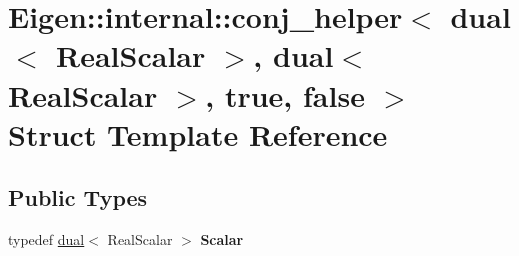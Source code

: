 \hypertarget{struct_eigen_1_1internal_1_1conj__helper_3_01dual_3_01_real_scalar_01_4_00_01dual_3_01_real_scal6e28e8a9ebcfb8ddcb71a8128b9186c8}{\section{Eigen\-:\-:internal\-:\-:conj\-\_\-helper$<$ dual$<$ Real\-Scalar $>$, dual$<$ Real\-Scalar $>$, true, false $>$ Struct Template Reference}
\label{struct_eigen_1_1internal_1_1conj__helper_3_01dual_3_01_real_scalar_01_4_00_01dual_3_01_real_scal6e28e8a9ebcfb8ddcb71a8128b9186c8}
}
\subsection*{Public Types}
\begin{DoxyCompactItemize}
\item 
\hypertarget{struct_eigen_1_1internal_1_1conj__helper_3_01dual_3_01_real_scalar_01_4_00_01dual_3_01_real_scal6e28e8a9ebcfb8ddcb71a8128b9186c8_ab3b618a99e0dd43e53ee5466aed47c11}{typedef \hyperlink{struct_d_r_d_s_p_1_1dual}{dual}$<$ Real\-Scalar $>$ {\bfseries Scalar}}\label{struct_eigen_1_1internal_1_1conj__helper_3_01dual_3_01_real_scalar_01_4_00_01dual_3_01_real_scal6e28e8a9ebcfb8ddcb71a8128b9186c8_ab3b618a99e0dd43e53ee5466aed47c11}

\end{DoxyCompactItemize}
